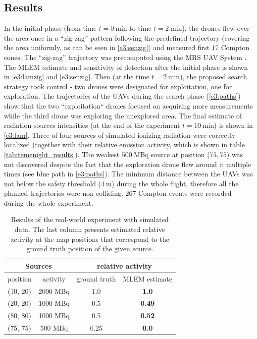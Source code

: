 
\subsection{Results}
In the initial phase (from time $t = \SI{0}{\minute}$ to time $t = \SI{2}{\minute}$), the drones flew over the area once in a ``zig-zag'' pattern following the predefined trajectory (covering the area uniformly, as can be seen in \autoref{e3:senzig}) and measured first $17$ Compton cones.
The ``zig-zag'' trajectory was precomputed using the MRS UAV System \cite{mrs_system}.
The \ac{MLEM} estimate and sensitivity of detection after the initial phase is shown in \autoref{e3:lamzig} and \autoref{e3:senzig}.
Then (at the time $t = \SI{2}{\minute}$), the proposed search strategy took control - two drones were designated for exploitation, one for exploration.
The trajectories of the \ac{UAV}s during the search phase (\autoref{e3:paths}) show that the two ``exploitation`` drones focused on acquiring more measurements while the third drone was exploring the unexplored area.
The final estimate of radiation sources intensities (at the end of the experiment $t = \SI{10}{\minute}$) is shown in \autoref{e3:lam}.
Three of four sources of simulated ionizing radiation were correctly localized (together with their relative emission activity, which is shown in table \autoref{tab:temenight_results}).
The weakest $\SI{500}{\mega\becquerel}$ source at position ($75, 75$) was not discovered despite the fact that the exploration drone flew around it multiple times (see blue path in \autoref{e3:paths}).
The minimum distance between the \ac{UAV}s was not below the safety threshold ($\SI{4}{\meter}$) during the whole flight, therefore all the planned trajectories were non-colliding.
267 Compton events were recorded during the whole experiment.
\begin{table}[htb]
\begin{center}
  \begin{tabular}{ |c|c|c|c| } 
 \hline
    \multicolumn{2}{|c}{Sources} &  \multicolumn{2}{|c|}{ relative activity } \\
 \hline
    position & activity & ground truth & MLEM estimate\\ 
 \hline
    (10, 20) & 2000 MBq & 1.0  & \textbf{1.0} \\ 
    (20, 20) & 1000 MBq &  0.5 & \textbf{0.49} \\ 
    (80, 80) & 1000 MBq &  0.5 & \textbf{0.52} \\ 
    (75, 75) & 500 MBq &  0.25 & \textbf{0.0} \\ 
 \hline
\end{tabular}
  \caption{Results of the real-world experiment with simulated data. The last column presents estimated relative activity at the map positions that correspond to the ground truth position of the given source.}
  \label{tab:temenight_results}
\end{center}
\end{table}

